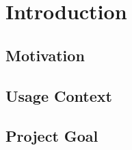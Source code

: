 \section{Introduction}\label{sec:Introduction}



\subsection{Motivation}\label{sec:Motivation}



\subsection{Usage Context}\label{sec:UsageContext} 




\subsection{Project Goal}\label{sec:Project Goal}





\newpage



















